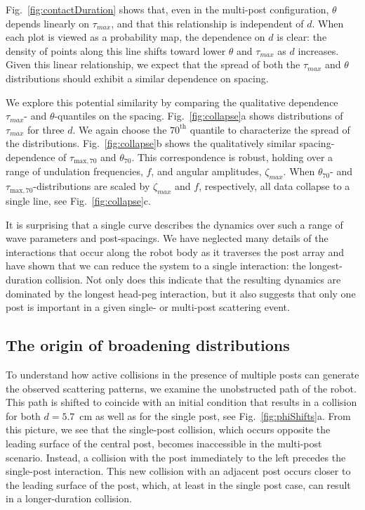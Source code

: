 \documentclass[aps,pre,twocolumn,superscriptaddress]{revtex4-1}
\begin{document}
Fig.~\ref{fig:contactDuration} shows that, even in the multi-post configuration, $\theta$ depends linearly on $\tau_{max}$, and that this relationship is independent of $d$. When each plot is viewed as a probability map, the dependence on $d$ is clear: the density of points along this line shifts toward lower $\theta$ and $\tau_{max}$ as $d$ increases. Given this linear relationship, we expect that the spread of both the $\tau_{max}$ and $\theta$ distributions should exhibit a similar dependence on spacing.  

We explore this potential similarity by comparing the qualitative dependence $\tau_{max}$- and $\theta$-quantiles on the spacing. Fig.~\ref{fig:collapse}a shows distributions of $\tau_{max}$ for three $d$. We again choose the $70^{\mathrm{th}}$ quantile to characterize the spread of the distributions. Fig.~\ref{fig:collapse}b shows the qualitatively similar spacing-dependence of $\tau_{\mathrm{max},70}$ and $\theta_{70}$. This correspondence is robust, holding over a range of undulation frequencies, $f$, and angular amplitudes, $\zeta_{max}$. When $\theta_{70}$- and $\tau_{\mathrm{max},70}$-distributions are scaled by $\zeta_{max}$ and $f$, respectively, all data collapse to a single line, see Fig.~\ref{fig:collapse}c. 

It is surprising that a single curve describes the dynamics over such a range of wave parameters and post-spacings. We have neglected many details of the interactions that occur along the robot body as it traverses the post array and have shown that we can reduce the system to a single interaction: the longest-duration collision. Not only does this indicate that the resulting dynamics are dominated by the longest head-peg interaction, but it also suggests that only one post is important in a given single- or multi-post scattering event.   


\subsection{The origin of broadening distributions}\label{sec:remap}

To understand how active collisions in the presence of multiple posts can generate the observed scattering patterns, we examine the unobstructed path of the robot. This path is shifted to coincide with an initial condition that results in a collision for both $d = 5.7$~cm as well as for the single post, see Fig.~\ref{fig:phiShifts}a. From this picture, we see that the single-post collision, which occurs opposite the leading surface of the central post, becomes inaccessible in the multi-post scenario. Instead, a collision with the post immediately to the left precedes the single-post interaction. This new collision with an adjacent post occurs closer to the leading surface of the post, which, at least in the single post case, can result in a longer-duration collision. 
\end{document}
